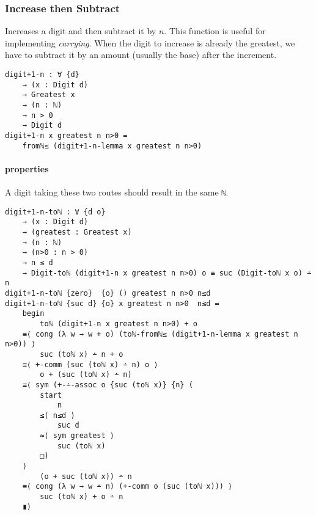 \documentclass[\main/thesis.tex]{subfiles}
\begin{document}
\subsubsection{Increase then Subtract}

Increases a digit and then subtract it by $ n $.
This function is useful for implementing \textit{carrying}.
When the digit to increase is already the greatest, we have to subtract it by
an amount (usually the base) after the increment.

\begin{lstlisting}
digit+1-n : ∀ {d}
    → (x : Digit d)
    → Greatest x
    → (n : ℕ)
    → n > 0
    → Digit d
digit+1-n x greatest n n>0 =
    fromℕ≤ (digit+1-n-lemma x greatest n n>0)
\end{lstlisting}

\paragraph{properties}

\begin{center}
\end{center}

A digit taking these two routes should result in the same {{\lstinline|ℕ|}}.

\begin{lstlisting}[basicstyle=\ttfamily\scriptsize]
digit+1-n-toℕ : ∀ {d o}
    → (x : Digit d)
    → (greatest : Greatest x)
    → (n : ℕ)
    → (n>0 : n > 0)
    → n ≤ d
    → Digit-toℕ (digit+1-n x greatest n n>0) o ≡ suc (Digit-toℕ x o) ∸ n
digit+1-n-toℕ {zero}  {o} () greatest n n>0 n≤d
digit+1-n-toℕ {suc d} {o} x greatest n n>0  n≤d =
    begin
        toℕ (digit+1-n x greatest n n>0) + o
    ≡⟨ cong (λ w → w + o) (toℕ-fromℕ≤ (digit+1-n-lemma x greatest n n>0)) ⟩
        suc (toℕ x) ∸ n + o
    ≡⟨ +-comm (suc (toℕ x) ∸ n) o ⟩
        o + (suc (toℕ x) ∸ n)
    ≡⟨ sym (+-∸-assoc o {suc (toℕ x)} {n} (
        start
            n
        ≤⟨ n≤d ⟩
            suc d
        ≈⟨ sym greatest ⟩
            suc (toℕ x)
        □)
    ⟩
        (o + suc (toℕ x)) ∸ n
    ≡⟨ cong (λ w → w ∸ n) (+-comm o (suc (toℕ x))) ⟩
        suc (toℕ x) + o ∸ n
    ∎)
\end{lstlisting}
\end{document}
